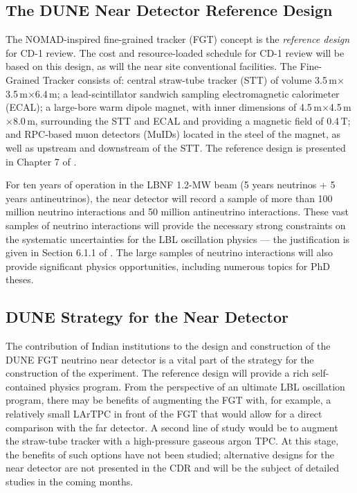 \subsection{The DUNE Near Detector Reference Design }

The NOMAD-inspired fine-grained tracker (FGT) concept is the \textit{reference 
design} for CD-1 review. The cost and resource-loaded schedule for CD-1 review 
will be based on this design, as will the near site conventional facilities. The 
Fine-Grained Tracker consists of:  central straw-tube tracker (STT) of volume 
3.5\,m$\times$3.5\,m$\times$6.4\,m; a lead-scintillator sandwich sampling electromagnetic calorimeter 
(ECAL); a large-bore warm dipole magnet, with inner dimensions of 
4.5\,m$\times$4.5\,m$\times$8.0\,m, surrounding the STT and ECAL and providing a magnetic field of 0.4\,T; 
and RPC-based muon detectors (MuIDs) located in the steel of the magnet, as well 
as upstream and downstream of the STT. The reference 
design is presented in Chapter 
7 of \voldune. 

For ten years of operation in the LBNF 1.2-MW beam (5 years neutrinos + 5 years 
antineutrinos), the near detector will record a sample of more than 100 million 
neutrino interactions and 50 million antineutrino interactions. These vast samples 
of neutrino interactions will provide the necessary strong constraints on the 
systematic uncertainties for the LBL oscillation physics --- the justification is 
given in Section 6.1.1 of \volphys. The large samples of neutrino 
interactions will also provide significant physics opportunities, including 
numerous topics for PhD theses.  

\subsection{DUNE Strategy for the Near Detector}

The contribution of Indian institutions to the design and construction of the DUNE 
FGT neutrino near detector is a vital part of the strategy for the construction 
of the experiment. The reference design will provide a rich self-contained physics 
program. From the perspective of an ultimate LBL oscillation program, there may 
be benefits of augmenting the FGT with, for example, a relatively small LArTPC 
in front of the FGT that would allow for a direct comparison with the far detector. 
A second line of study would be to augment the straw-tube tracker  with 
a high-pressure gaseous argon TPC. At this stage, the benefits of such options 
have not been studied; alternative designs for the near detector are not presented in 
the CDR and will be the subject of detailed studies in the coming months. 

